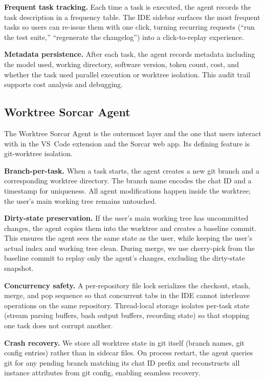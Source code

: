 \documentclass{article}
\begin{document}
\textbf{Frequent task tracking.}  Each time a task is executed, the agent records the task description in a frequency table.  The IDE sidebar surfaces the most frequent tasks so users can re-issue them with one click, turning recurring requests (``run the test suite,'' ``regenerate the changelog'') into a click-to-replay experience.

\textbf{Metadata persistence.}  After each task, the agent records metadata including the model used, working directory, software version, token count, cost, and whether the task used parallel execution or worktree isolation.  This audit trail supports cost analysis and debugging.

\subsection{Worktree Sorcar Agent}
\label{sec:worktree-agent}

The Worktree Sorcar Agent is the outermost layer and the one that users interact with in the VS~Code extension and the Sorcar web app.  Its defining feature is git-worktree isolation.

\textbf{Branch-per-task.}  When a task starts, the agent creates a new git branch and a corresponding worktree directory.  The branch name encodes the chat ID and a timestamp for uniqueness.  All agent modifications happen inside the worktree; the user's main working tree remains untouched.

\textbf{Dirty-state preservation.}  If the user's main working tree has uncommitted changes, the agent copies them into the worktree and creates a baseline commit.  This ensures the agent sees the same state as the user, while keeping the user's actual index and working tree clean.  During merge, we use cherry-pick from the baseline commit to replay only the agent's changes, excluding the dirty-state snapshot.

\textbf{Concurrency safety.}  A per-repository file lock serializes the checkout, stash, merge, and pop sequence so that concurrent tabs in the IDE cannot interleave operations on the same repository. Thread-local storage isolates per-task state (stream parsing buffers, bash output buffers, recording state) so that stopping one task does not corrupt another.

\textbf{Crash recovery.}  We store all worktree state in git itself (branch names, git config entries) rather than in sidecar files.  On process restart, the agent queries git for any pending branch matching its chat ID prefix and reconstructs all instance attributes from git config, enabling seamless recovery.
\end{document}
